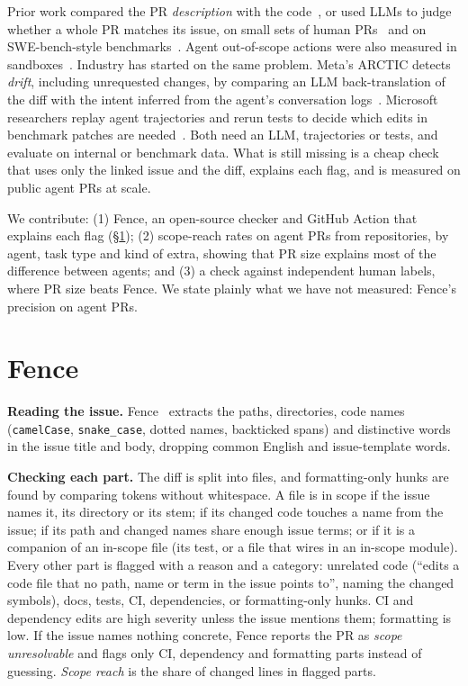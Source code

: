 \documentclass[10pt,conference]{IEEEtran}
\begin{document}
Prior work compared the PR \emph{description} with the code~\cite{gong2026prmci}, or used LLMs to judge whether a whole PR matches its issue, on small sets of human PRs~\cite{isik2025forge,altunhan2026finetune} and on SWE-bench-style benchmarks~\cite{wang2026paichecker}. Agent out-of-scope actions were also measured in sandboxes~\cite{qu2026overeager,trong2026swemisbehavior}. Industry has started on the same problem. Meta's ARCTIC detects \emph{drift}, including unrequested changes, by comparing an LLM back-translation of the diff with the intent inferred from the agent's conversation logs~\cite{maddila2026arctic}. Microsoft researchers replay agent trajectories and rerun tests to decide which edits in benchmark patches are needed~\cite{goel2026overedit}. Both need an LLM, trajectories or tests, and evaluate on internal or benchmark data. What is still missing is a cheap check that uses only the linked issue and the diff, explains each flag, and is measured on public agent PRs at scale.

We contribute: (1) Fence, an open-source checker and GitHub Action that explains each flag (\S\ref{sec:fence}); (2) scope-reach rates on \nCorpus{} agent PRs from \nRepos{} repositories, by agent, task type and kind of extra, showing that PR size explains most of the difference between agents; and (3) a check against independent human labels, where PR size beats Fence. We state plainly what we have not measured: Fence's precision on agent PRs.

\section{Fence}\label{sec:fence}
\textbf{Reading the issue.} Fence~ extracts the paths, directories, code names (\texttt{camelCase}, \texttt{snake\_case}, dotted names, backticked spans) and distinctive words in the issue title and body, dropping common English and issue-template words.

\textbf{Checking each part.} The diff is split into files, and formatting-only hunks are found by comparing tokens without whitespace. A file is in scope if the issue names it, its directory or its stem; if its changed code touches a name from the issue; if its path and changed names share enough issue terms; or if it is a companion of an in-scope file (its test, or a file that wires in an in-scope module). Every other part is flagged with a reason and a category: unrelated code (``edits a code file that no path, name or term in the issue points to'', naming the changed symbols), docs, tests, CI, dependencies, or formatting-only hunks. CI and dependency edits are high severity unless the issue mentions them; formatting is low. If the issue names nothing concrete, Fence reports the PR as \emph{scope unresolvable} and flags only CI, dependency and formatting parts instead of guessing. \emph{Scope reach} is the share of changed lines in flagged parts.
\end{document}
